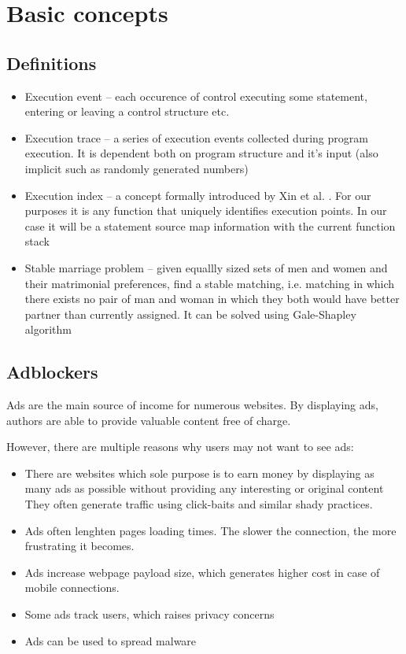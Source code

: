 \chapter{Basic concepts}
\section{Definitions}

\begin{itemize}
  \item Execution event -- each occurence of control executing some statement, entering or leaving a control structure etc.
  \item Execution trace -- a series of execution events collected during program execution. 
           It is dependent both on program structure and it's input (also implicit such as randomly generated numbers)
  \item Execution index -- a concept formally introduced by Xin et al. \cite{sigplan:execution-indexing}. 
                                         For our purposes it is any function that uniquely identifies execution points. In our case it will
                                         be a statement source map information with the current function stack
  \item Stable marriage problem -- given equallly sized sets of men and women and their matrimonial preferences,
                                                       find a stable matching, i.e. matching in which there exists no pair of man and woman 
                                                       in which they both would have better partner than currently assigned.
                                                       It can be solved using Gale-Shapley algorithm \cite{wiki:smp}
\end{itemize}

\section{Adblockers}

Ads are the main source of income for numerous websites. By displaying ads, authors are able to provide
valuable content free of charge. 

However, there are multiple reasons why users may not want to see ads: 
\begin{itemize}
  \item There are websites which sole purpose is to earn money by displaying as many ads 
           as possible without providing any interesting or original content
           They often generate traffic using click-baits and similar shady practices.
  \item Ads often lenghten pages loading times. The slower the connection, the more frustrating it becomes.
  \item Ads increase webpage payload size, which generates higher cost in case of mobile connections.
  \item Some ads track users, which raises privacy concerns
  \item Ads can be used to spread malware
\end{itemize}

